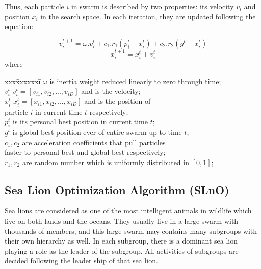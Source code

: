 \documentclass[a4paper,13pt,2p]{report}
\begin{document}
Thus, each particle $i$ in swarm is described by two properties: its velocity $v_i$ and position $x_i$ in the search space. In each iteration, they are updated following the equation: 

\begin{equation} \label{eq_pso_1}
v_i^{t+1} = \omega.v_i^t + c_1.r_1(p_i^t - x_i^t) + c_2.r_2(g^t - x_i^t)
\end{equation}
\begin{equation} \label{eq_pso_2}
x_i^{t+1} = x_i^t + v_i^t
\end{equation}
where 
\begin{tabbing}
	xxx\=xxxxxxi\=\kill
	\>	$\omega$			\>	is inertia weight reduced linearly to zero through time; \\
	\>	$v_i^t$			\>	$v_i^t = [v_{i1}, v_{i2}, ..., v_{iD}]$ and is the velocity;	\\
	\>	$x_i^t$			\>	$x_i^t = [x_{i1}, x_{i2}, ..., x_{iD}]$ and is the position of 	\\
	\> 	\phantom{inv}	\> 	particle $i$ in current time $t$ respectively;\\
	\>	$p_i^t$			\>	is its personal best position in current time $t$; \\
	\>	$g^t$			\>	is global best position ever of entire swarm up to time $t$; \\
	\>	$c_1, c_2$ 		\>	are acceleration coefficients that pull particles \\
	\>	\phantom{inv} 	\>	faster to personal best and global best respectively;\\
	\>	$r_1, r_2$ 		\>	are random number which is uniformly distributed in $[0,1]$; \\
\end{tabbing}
\subsection{Sea Lion Optimization Algorithm (SLnO)}
\label{slno_standard} 

	Sea lions are considered as one of the most intelligent animals in wildlife which live on both lands and the oceans. They usually live in a large swarm with thousands of members, and this large swarm may contains many subgroups with their own hierarchy as well. In each subgroup, there is a dominant sea lion playing a role as the leader of the subgroup. All activities of subgroups are decided following the leader ship of that sea lion.
	
	
\end{document}
